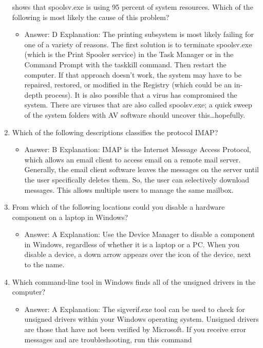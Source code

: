 \documentclass{article}
\begin{document}
\begin{enumerate}
shows that spoolsv.exe is using 95 percent of system resources.
Which of the following is most likely the cause of this problem?
    \begin{itemize}
        \item Answer: D
Explanation: The printing subsystem is most likely failing for one of a variety of reasons.
The first solution is to terminate spoolsv.exe (which is the Print Spooler service)
in the Task Manager or in the Command Prompt with the taskkill command.
Then restart the computer. If that approach doesn’t work, the system may have to be
repaired, restored, or modified in the Registry (which could be an in-depth process).
It is also possible that a virus has compromised the system. There are viruses that are
also called spoolsv.exe; a quick sweep of the system folders with AV software should
uncover this…hopefully.
    \end{itemize}
    \item Which of the following descriptions classifies the protocol IMAP?
    \begin{itemize}
        \item Answer: B
Explanation: IMAP is the Internet Message Access Protocol, which allows an email
client to access email on a remote mail server. Generally, the email client software
leaves the messages on the server until the user specifically deletes them. So, the user
can selectively download messages. This allows multiple users to manage the same
mailbox.
    \end{itemize}
    \item From which of the following locations could you disable a
hardware component on a laptop in Windows?
    \begin{itemize}
        \item Answer: A
Explanation: Use the Device Manager to disable a component in Windows, regardless
of whether it is a laptop or a PC. When you disable a device, a down arrow appears
over the icon of the device, next to the name.
    \end{itemize}
    \item Which command-line tool in Windows finds all of the unsigned
drivers in the computer?
    \begin{itemize}
        \item Answer: A
Explanation: The sigverif.exe tool can be used to check for unsigned drivers within
your Windows operating system. Unsigned drivers are those that have not been verified
by Microsoft. If you receive error messages and are troubleshooting, run this command

\end{itemize}
\end{enumerate}
\end{document}
